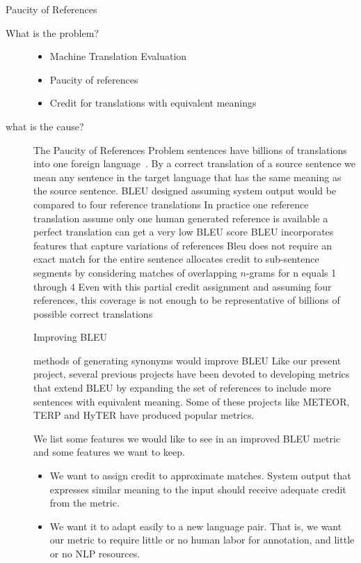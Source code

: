 \begin{block}{Paucity of References}
\begin{description}
\item[What is the problem?] 
\begin{itemize}
\item Machine Translation Evaluation
\item 
Paucity of references
\item Credit for translations with equivalent meanings
\end{itemize}
\item[what is the cause? ]
The Paucity of References Problem
sentences  have billions of  translations into one foreign language~\cite{dreyer-marcu:2012:NAACL-HLT}. 
By a correct translation of a source sentence we mean any sentence in the target language that has the same meaning as the source sentence. 
BLEU designed assuming   system output would be compared to   four reference translations 
In practice   one  reference translation 
assume only one human generated reference is available
a perfect  translation  can get a very low BLEU score 
BLEU incorporates features that capture variations of references 
Bleu does not require an exact match for the entire sentence 
allocates credit to sub-sentence segments by considering matches  of overlapping $n$-grams for   n equals 1 through 4
Even with this partial credit assignment and assuming four references,  this coverage is not enough to be representative of billions of possible correct translations

Improving BLEU

methods of generating synonyms would improve  BLEU 
Like our present project, several previous projects have been devoted to developing metrics that extend BLEU by expanding the set of references to include more sentences with equivalent meaning. 
Some of these projects like METEOR\cite{banerjee-lavie:2005:MTSumm}\cite{denkowski:lavie:meteor-wmt:2014}, TERP\cite{snover-06}\cite{snover-08} and HyTER have produced popular metrics. 


We list some features we would like to see in an improved BLEU metric and some features we want to keep.  
\begin{itemize}
\item 
We want to assign credit to approximate matches. 
System output that expresses similar meaning to the input should receive adequate credit from the metric. 
\item 
We want  it to adapt easily to a new language pair. 
That is, we want our metric to require little or no human labor for annotation, and little or no NLP resources. 


\end{itemize}
\end{description}
\end{block}

